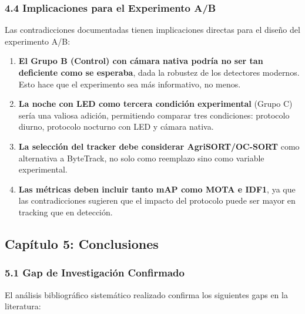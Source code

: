 \subsubsection{4.4 Implicaciones para el Experimento A/B}


Las contradicciones documentadas tienen implicaciones directas para el diseño del experimento A/B:


\begin{enumerate}
\item \textbf{El Grupo B (Control) con cámara nativa podría no ser tan deficiente como se esperaba}, dada la robustez de los detectores modernos. Esto hace que el experimento sea más informativo, no menos.
\item \textbf{La noche con LED como tercera condición experimental} (Grupo C) sería una valiosa adición, permitiendo comparar tres condiciones: protocolo diurno, protocolo nocturno con LED y cámara nativa.
\item \textbf{La selección del tracker debe considerar AgriSORT/OC-SORT} como alternativa a ByteTrack, no solo como reemplazo sino como variable experimental.
\item \textbf{Las métricas deben incluir tanto mAP como MOTA e IDF1}, ya que las contradicciones sugieren que el impacto del protocolo puede ser mayor en tracking que en detección.
\end{enumerate}

\hline


\subsection{Capítulo 5: Conclusiones}


\subsubsection{5.1 Gap de Investigación Confirmado}


El análisis bibliográfico sistemático realizado confirma los siguientes gaps en la literatura:


